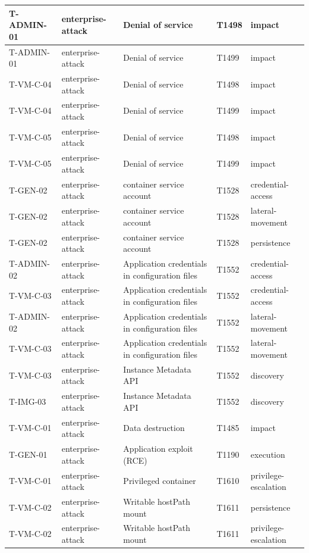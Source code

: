 \begin{longtable}{|l|l|l|l|l|}
    T-ADMIN-01 & enterprise-attack & Denial of service & T1498 & impact \\ \hline
    T-ADMIN-01 & enterprise-attack & Denial of service & T1499 & impact \\ \hline
    T-VM-C-04 & enterprise-attack & Denial of service & T1498 & impact \\ \hline
    T-VM-C-04 & enterprise-attack & Denial of service & T1499 & impact \\ \hline
    T-VM-C-05 & enterprise-attack & Denial of service & T1498 & impact \\ \hline
    T-VM-C-05 & enterprise-attack & Denial of service & T1499 & impact \\ \hline
    T-GEN-02 & enterprise-attack & container service account & T1528 & credential-access \\ \hline
    T-GEN-02 & enterprise-attack & container service account & T1528 & lateral-movement \\ \hline
    T-GEN-02 & enterprise-attack & container service account & T1528 & persistence \\ \hline
    T-ADMIN-02 & enterprise-attack & Application credentials in configuration files & T1552 & credential-access \\ \hline
    T-VM-C-03 & enterprise-attack & Application credentials in configuration files & T1552 & credential-access \\ \hline
    T-ADMIN-02 & enterprise-attack & Application credentials in configuration files & T1552 & lateral-movement \\ \hline
    T-VM-C-03 & enterprise-attack & Application credentials in configuration files & T1552 & lateral-movement \\ \hline
    T-VM-C-03 & enterprise-attack & Instance Metadata API & T1552 & discovery \\ \hline
    T-IMG-03 & enterprise-attack & Instance Metadata API & T1552 & discovery \\ \hline
    T-VM-C-01 & enterprise-attack & Data destruction & T1485 & impact \\ \hline
    T-GEN-01 & enterprise-attack & Application exploit (RCE) & T1190 & execution \\ \hline
    T-VM-C-01 & enterprise-attack & Privileged container & T1610 & privilege-escalation \\ \hline
    T-VM-C-02 & enterprise-attack & Writable hostPath mount & T1611 & persistence \\ \hline
    T-VM-C-02 & enterprise-attack & Writable hostPath mount & T1611 & privilege-escalation \\ \hline

\end{longtable}
